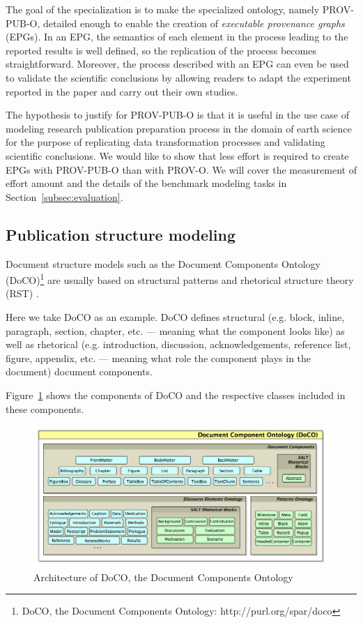 The goal of the specialization is to make the specialized ontology, namely PROV-PUB-O, detailed enough to enable the creation of \emph{executable provenance graphs} (EPGs). In an EPG, the semantics of each element in the process leading to the reported results is well defined, so the replication of the process becomes straightforward. Moreover, the process described with an EPG can even be used to validate the scientific conclusions by allowing readers to adapt the experiment reported in the paper and carry out their own studies.

The hypothesis to justify for PROV-PUB-O is that it is useful in the use case of modeling research publication preparation process in the domain of earth science for the purpose of replicating data transformation processes and validating scientific conclusions. We would like to show that less effort is required to create EPGs with PROV-PUB-O than with PROV-O. We will cover the measurement of effort amount and the details of the benchmark modeling tasks in Section~\ref{subsec:evaluation}.

\subsection{Publication structure modeling}
\label{subsec:structure}
Document structure models such as the Document Components Ontology (DoCO)\footnote{DoCO, the Document Components Ontology: http://purl.org/spar/doco} are usually based on structural patterns \cite{di2014dealing} and rhetorical structure theory (RST) \cite{taboada2006rhetorical}.

Here we take DoCO as an example. DoCO defines structural (e.g. block, inline, paragraph, section, chapter, etc. --- meaning what the component looks like) as well as rhetorical (e.g. introduction, discussion, acknowledgements, reference list, figure, appendix, etc. --- meaning what role the component plays in the document) document components.

Figure~\ref{fig:doco} shows the components of DoCO and the respective classes included in these components.
\begin{figure}[h]
	\includegraphics[width=\textwidth]{doco-architecture.png}
	\caption{Architecture of DoCO, the Document Components Ontology}
	\label{fig:doco}
\end{figure}

